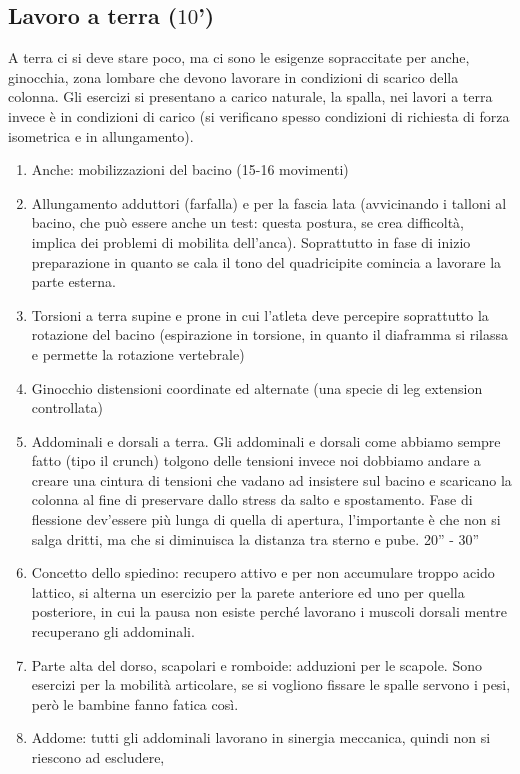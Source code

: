 \subsection{Lavoro a terra ($10$')}
A terra ci si deve stare poco, ma ci sono le esigenze sopraccitate per anche, ginocchia, zona lombare che
devono lavorare in condizioni di scarico della colonna. Gli esercizi si presentano a carico naturale, la spalla,
nei lavori a terra invece è in condizioni di carico (si verificano spesso condizioni di richiesta di forza
isometrica e in allungamento).
\begin{enumerate}
\item Anche: mobilizzazioni del bacino (15-16 movimenti)
\item Allungamento adduttori (farfalla) e per la fascia lata (avvicinando i talloni al bacino, che può essere
anche un test: questa postura, se crea difficoltà, implica dei problemi di mobilita dell'anca).
Soprattutto in fase di inizio preparazione in quanto se cala il tono del quadricipite comincia a
lavorare la parte esterna.
\item Torsioni a terra supine e prone in cui l'atleta deve percepire soprattutto la rotazione del bacino
(espirazione in torsione, in quanto il diaframma si rilassa e permette la rotazione vertebrale)
\item Ginocchio distensioni coordinate ed alternate (una specie di leg extension controllata)
\item Addominali e dorsali a terra. Gli addominali e dorsali come abbiamo sempre fatto (tipo il crunch)
tolgono delle tensioni invece noi dobbiamo andare a creare una cintura di tensioni che vadano ad
insistere sul bacino e scaricano la colonna al fine di preservare dallo stress da salto e spostamento.
Fase di flessione dev'essere più lunga di quella di apertura, l'importante è che non si salga dritti, ma
che si diminuisca la distanza tra sterno e pube. 20” - 30”
\item Concetto dello spiedino: recupero attivo e per non accumulare troppo acido lattico, si alterna un
esercizio per la parete anteriore ed uno per quella posteriore, in cui la pausa non esiste perché
lavorano i muscoli dorsali mentre recuperano gli addominali.
\item Parte alta del dorso, scapolari e romboide: adduzioni per le scapole. Sono esercizi per la mobilità
articolare, se si vogliono fissare le spalle servono i pesi, però le bambine fanno fatica così.
\item Addome: tutti gli addominali lavorano in sinergia meccanica, quindi non si riescono ad escludere,

\end{enumerate}
